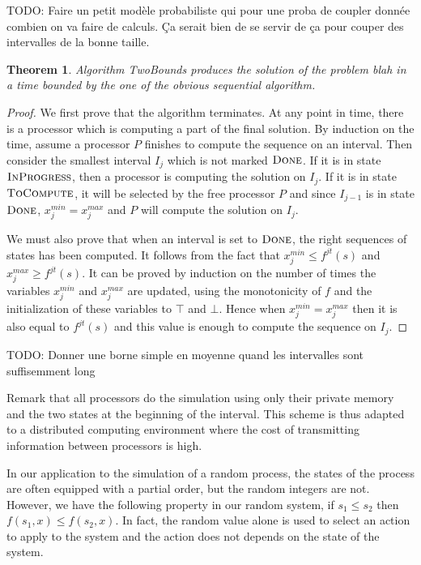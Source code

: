 \documentclass[a4paper,10pt]{article}
\newcommand{\todo}[1]{{\color{red} TODO: {#1}}}
\newtheorem{theorem}{Theorem}
\begin{document}
 \todo{Faire un petit modèle probabiliste qui pour une proba de coupler donnée combien on va faire de calculs.
 Ça serait bien de se servir de ça pour couper des intervalles de la bonne taille. }
 
 \begin{theorem}
  Algorithm TwoBounds produces the solution of the problem blah in a time 
  bounded by the one of the obvious sequential algorithm.
  \end{theorem}
  
\begin{proof}
We first prove that the algorithm terminates. At any point in time, there is a processor which is computing a part of the final solution. By induction on the time, assume a processor $P$ finishes to compute the sequence on an interval.
Then consider the smallest interval $I_j$ which is not marked $\textsc{Done}$. If it is in state $\textsc{InProgress}$, then 
 a processor is computing the solution on $I_j$. If it is in state $\textsc{ToCompute}$, it will be selected by the free processor $P$ and since $I_{j-1}$ is in state $\textsc{Done}$, $x_j^{min} = x_j^{max}$ and $P$ will compute the solution on $I_j$.

We must also prove that when an interval is set to $\textsc{Done}$, the right sequences of states has been computed. 
It follows from the fact that  $x_j^{min} \leq f^{jt}(s)$ and $x_j^{max} \geq f^{jt}(s)$. It can be proved by induction on the number of times the variables $x_j^{min}$ and  $x_j^{max}$ are updated, using the monotonicity of $f$ and the initialization of these variables to $\top$ and $\bot$. Hence when $x_j^{min} = x_j^{max}$ then it is also equal to $f^{jt}(s)$ and this value is enough to 
compute the sequence on $I_j$. 
\end{proof}

\todo{Donner une borne simple en moyenne quand les intervalles sont suffisemment long} 
 
Remark that all processors do the simulation using only their private memory and the two states at the beginning of the interval. This scheme is thus adapted to a distributed computing environment where the cost of transmitting information between processors is high. 


In our application to the simulation of a random process, the states of the process 
are often equipped with a partial order, but the random integers are not. 
However, we have the following property in our random system, if $s_1 \leq s_2$ then $f(s_1,x) \leq f(s_2,x)$. 
In fact, the random value alone is used to select an action to apply to the system and the action does not depends on the state of the system.
\end{document}
